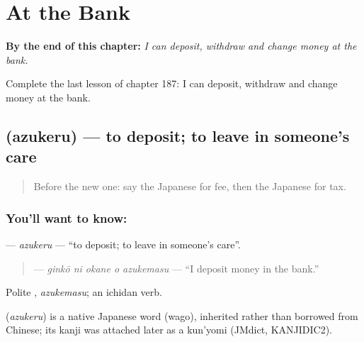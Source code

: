 
\chapter{At the Bank}
\label{ch:ja-at-the-bank}

\begin{chapteropening}
\textbf{By the end of this chapter:} \emph{I can deposit, withdraw and change money at the bank.}

Complete the last lesson of chapter 187: I can deposit, withdraw and change money at the bank.
\end{chapteropening}

\section[\texorpdfstring{\ja{あずける} (azukeru)}{あずける (azukeru)}]{ (azukeru) — to deposit; to leave in someone's care}

\label{lesson:JA-C187-azukeru}



\begin{quote}
Before the new one: say the Japanese for fee, then the Japanese for tax.
\end{quote}

\subsection*{You'll want to know: }
\textbf{} — \emph{azukeru} — \textquotedblleft{}to deposit; to leave in someone's care\textquotedblright{}.

\begin{quote}
\textbf{  } — \emph{ginkō ni okane o azukemasu} — \textquotedblleft{}I deposit money in the bank.\textquotedblright{}
\end{quote}

Polite \textbf{}, \emph{azukemasu}; an ichidan verb.

\begin{cousinweb}
\textbf{} (\emph{azukeru}) is a native Japanese word (wago), inherited rather than borrowed from Chinese; its kanji was attached later as a kun'yomi (JMdict, KANJIDIC2).
\end{cousinweb}

